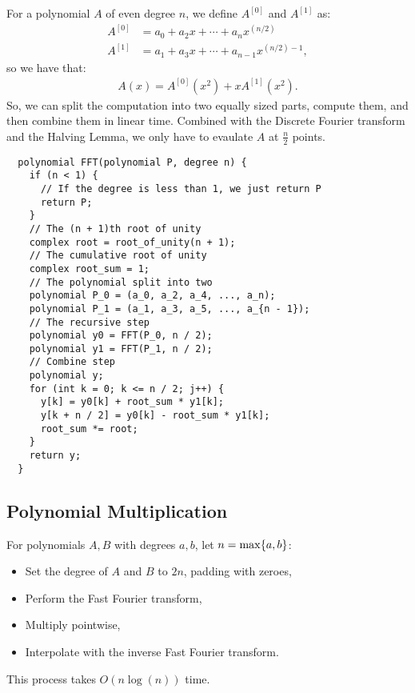 For a polynomial $A$ of even degree $n$,
we define $A^{[0]}$ and $A^{[1]}$ as: \begin{align*}
  A^{[0]} &= a_0 + a_2x + \cdots + a_{n}x^{(n / 2)} \\
  A^{[1]} &= a_1 + a_3x + \cdots + a_{n - 1}x^{(n / 2) - 1},
\end{align*} so we have that: \begin{gather*}
  A(x) = A^{[0]}(x^2) + xA^{[1]}(x^2).
\end{gather*} So, we can split the computation into two
equally sized parts, compute them, and then combine them in linear time.
Combined with the Discrete Fourier transform and the Halving Lemma, we
only have to evaulate $A$ at $\frac{n}{2}$ points.
\begin{lstlisting}
  polynomial FFT(polynomial P, degree n) {
    if (n < 1) {
      // If the degree is less than 1, we just return P
      return P;
    }
    // The (n + 1)th root of unity
    complex root = root_of_unity(n + 1);
    // The cumulative root of unity
    complex root_sum = 1;
    // The polynomial split into two
    polynomial P_0 = (a_0, a_2, a_4, ..., a_n);
    polynomial P_1 = (a_1, a_3, a_5, ..., a_{n - 1});
    // The recursive step
    polynomial y0 = FFT(P_0, n / 2);
    polynomial y1 = FFT(P_1, n / 2);
    // Combine step
    polynomial y;
    for (int k = 0; k <= n / 2; j++) {
      y[k] = y0[k] + root_sum * y1[k];
      y[k + n / 2] = y0[k] - root_sum * y1[k];
      root_sum *= root;
    }
    return y;
  }
\end{lstlisting}

\subsection{Polynomial Multiplication}

For polynomials $A, B$ with degrees $a, b$, let $n = \operatorname{max}\{a, b\}$: 
\begin{itemize}
  \item Set the degree of $A$ and $B$ to $2n$, padding with zeroes,
  \item Perform the Fast Fourier transform,
  \item Multiply pointwise,
  \item Interpolate with the inverse Fast Fourier transform.
\end{itemize} This process takes $O(n \log(n))$ time.